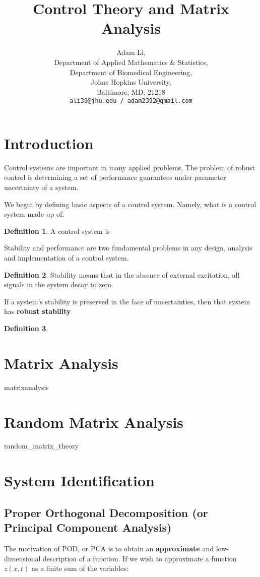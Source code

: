 \documentclass{article}
\title{Control Theory and Matrix Analysis}
\author{
  Adam Li, \\
  Department of Applied Mathematics \& Statistics, \\
  Department of Biomedical Engineering, \\
  Johns Hopkins University, \\
  Baltimore, MD, 21218 \\
  \texttt{ali39@jhu.edu / adam2392@gmail.com}
}
\theoremstyle{definition}
\newtheorem{definition}{Definition}[section]
\theoremstyle{remark}
\theoremstyle{lemma}
\theoremstyle{theorem}
\theoremstyle{corollary}
\theoremstyle{property}
\begin{document}
\maketitle

\tableofcontents

\section{Introduction}
	Control systems are important in many applied problems. The problem of robust control is determining a set of performance guarantees under parameter uncertainty of a system.

	We begin by defining basic aspects of a control system. Namely, what is a control system made up of.

	\begin{definition}
		A control system is 
	\end{definition}

	Stability and performance are two fundamental problems in any design, analysis and implementation of a control system.

	\begin{definition}
		Stability means that in the absence of external excitation, all signals in the system decay to zero.

		If a system's stability is preserved in the face of uncertainties, then that system has \textbf{robust stability}
	\end{definition}

	\begin{definition}

	\end{definition}

\section{Matrix Analysis}
	{matrixanalysis}

\section{Random Matrix Analysis}
	{random_matrix_theory}

\section{System Identification}
	\subsection{Proper Orthogonal Decomposition (or Principal Component Analysis)}
		The motivation of POD, or PCA is to obtain an \textbf{approximate} and low-dimensional description of a function. If we wish to approximate a function $z(x, t)$ as a finite sum of the variables:
\end{document}
